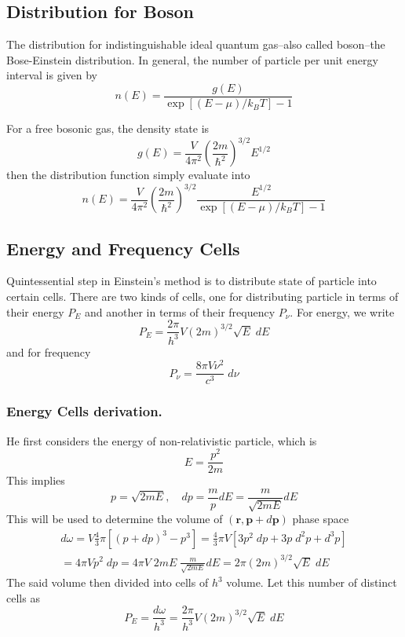 \documentclass[../../../Main.tex]{subfiles}
\begin{document}
\subsection{Distribution for Boson}
The distribution for indistinguishable ideal quantum gas--also called boson--the Bose-Einstein distribution. In general, the number of particle per unit energy interval is given by 
\begin{equation*}
    n(E)=\frac{g(E)}{\exp\left[(E-\mu)/k_BT\right]-1}
\end{equation*}

For a free bosonic gas, the density state is 
\begin{equation*}
    g(E)=\frac{V}{4\pi^2}\left(\frac{2m}{\hbar^2}\right)^{3/2}E^{1/2}
\end{equation*}
then the distribution function simply evaluate into
\begin{equation*}
    n(E)=\frac{V}{4\pi^2}\left(\frac{2m}{\hbar^2}\right)^{3/2}\frac{{E}^{1/2}}{\exp\left[(E-\mu)/k_BT\right]-1}
\end{equation*}

\subsection{Energy and Frequency Cells}
Quintessential step in Einstein's method is to distribute state of particle into certain cells. There are two kinds of cells, one for distributing particle in terms of their energy $P_E$ and another in terms of their frequency $P_\nu$. For energy, we write
\begin{equation*}
    P_E=\frac{2\pi}{h^3}V(2m)^{3/2}\sqrt{E}\;dE
\end{equation*}
and for frequency
\begin{equation*}
    P_\nu=\frac{8\pi V\nu^2}{c^3}\;d\nu
\end{equation*}

\subsubsection{Energy Cells derivation.} He first considers the energy of non-relativistic particle, which is 
\begin{equation*}
    E=\frac{p^2}{2m}
\end{equation*}
This implies
\begin{equation*}
    p=\sqrt{2mE},\quad dp=\frac{m}{p}dE=\frac{m}{\sqrt{2mE}}dE
\end{equation*}
This will be used to determine the volume of $(\mathbf{r},\mathbf{p}+ d\mathbf{p})$ phase space
\begin{multline*}
    d\omega=V \frac{4}{3}\pi\left[(p+dp)^3-p^3\right] = \frac{4}{3}\pi V\left[3p^2\;dp+3p\;d^2p+d^3p\right]\\
    =4\pi Vp^2\;dp =4\pi V \;2mE\;\frac{m}{\sqrt{2mE}}dE=2\pi(2m)^{3/2}\sqrt{E}\;dE
\end{multline*} 
The said volume then divided into cells of $h^3$ volume. Let this number of distinct cells as 
\begin{equation*}
    P_E=\frac{d\omega}{h^3}=\frac{2\pi}{h^3}V(2m)^{3/2}\sqrt{E}\;dE
\end{equation*}
\end{document}

